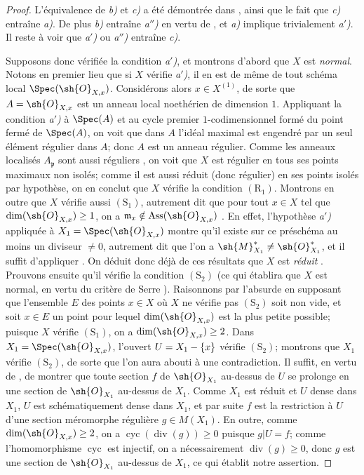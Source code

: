 \begin{proof}
L'équivalence de \emph{b)} et \emph{c)} a été démontrée dans , ainsi que le fait que \emph{c)} entraîne \emph{a)}.
De plus \emph{b)} entraîne \emph{a$''$)} en vertu de , et \emph{a)} implique trivialement \emph{a$'$)}.
Il reste à voir que \emph{a$'$)} ou \emph{a$''$)} entraîne \emph{c)}.

Supposons donc vérifiée la condition \emph{a$'$)}, et montrons d'abord que $X$ est \emph{normal}.
Notons en premier lieu que si $X$ vérifie \emph{a$'$)}, il en est de même de tout schéma local $\Spec(\sh{O}_{X,x})$.
Considérons alors $x\in X^{(1)}$, de sorte que $A=\sh{O}_{X,x}$ est un anneau local noethérien de dimension $1$.
Appliquant la condition \emph{a$'$)} à $\Spec(A)$ et au cycle premier $1$-codimensionnel formé du point fermé de $\Spec(A)$, on voit que dans $A$ l'idéal maximal est engendré par un seul élément régulier dans $A$;
donc  $A$ est un anneau régulier.
Comme les anneaux localisés $A_{\mathfrak p}$ sont aussi réguliers , on voit que $X$ est régulier en tous ses points maximaux non isolés;
comme il est aussi réduit (donc régulier) en ses points isolés par hypothèse, on en conclut que $X$ vérifie la condition $(\mathrm{R}_1)$.
Montrons en outre que $X$ vérifie aussi $(\mathrm{S}_1)$, autrement dit que pour tout $x\in X$ tel que $\dim(\sh{O}_{X,x})\geq1$, on a $\mathfrak{m}_x\notin\operatorname{Ass}(\sh{O}_{X,x})$ .
En effet, l'hypothèse \emph{a$'$)} appliquée à $X_1=\Spec(\sh{O}_{X,x})$ montre qu'il existe sur ce préschéma au moins un diviseur $\neq0$, autrement dit que l'on a $\sh{M}_{X_1}^*\neq\sh{O}_{X_1}^*$, et il suffit d'appliquer .
On déduit donc déjà de ces résultats que $X$ est \emph{réduit} .
Prouvons ensuite qu'il vérifie la condition $(\mathrm{S}_2)$ (ce qui établira que $X$ est normal, en vertu du critère de Serre ).
Raisonnons par l'absurde en supposant que l'ensemble $E$ des points $x\in X$ où $X$ ne vérifie pas $(\mathrm{S}_2)$ soit non vide, et soit $x\in E$ un point pour lequel $\dim(\sh{O}_{X,x})$ est la plus petite possible;
puisque $X$ vérifie $(\mathrm{S}_1)$, on a $\dim(\sh{O}_{X,x})\geq2$.
Dans $X_1=\Spec(\sh{O}_{X,x})$, l'ouvert $U=X_1-\{x\}$ vérifie $(\mathrm{S}_2)$;
montrons que $X_1$ vérifie $(\mathrm{S}_2)$, de sorte que l'on aura abouti à une contradiction.
Il suffit, en vertu de , de montrer que toute section $f$ de $\sh{O}_{X_1}$ au-dessus de $U$ se prolonge en une section de $\sh{O}_{X_1}$ au-dessus de $X_1$.
Comme $X_1$ est réduit et $U$ dense dans $X_1$, $U$ est schématiquement dense dans $X_1$, et par suite $f$ est la restriction à $U$ d'une section méromorphe régulière $g\in M(X_1)$.
En outre, comme $\dim(\sh{O}_{X,x})\geq2$, on a $\operatorname{cyc}(\operatorname{div}(g))\geq0$ puisque $g|U=f$;
comme l'homomorphisme $\operatorname{cyc}$ est injectif, on a nécessairement $\operatorname{div}(g)\geq0$, donc  $g$ est une section de $\sh{O}_{X_1}$ au-dessus de $X_1$, ce qui établit notre assertion.


\end{proof}
